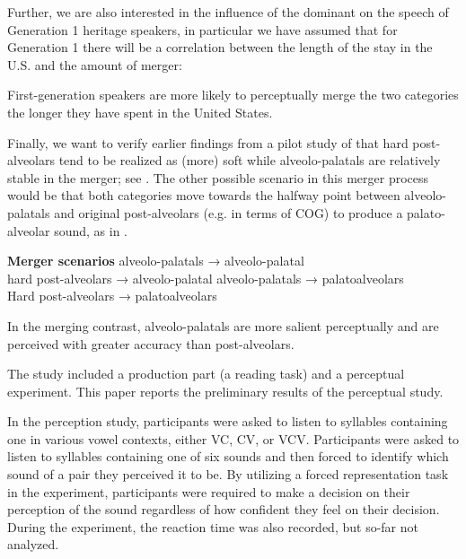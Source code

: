 \documentclass[output=paper,modfonts,newtxmath,hidelinks,]{langscibook}
\begin{document}
Further, we are also interested in the influence of the dominant  on the speech of Generation 1 heritage speakers, in particular we have assumed that for Generation 1 there will be a correlation between the length of the stay in the U.S. and the amount of merger:


\begin{exe}
  First-generation speakers are more likely to perceptually merge   the two categories the longer they have spent in the United   States.
\end{exe}


Finally, we want to verify earlier findings from a pilot study of \citet{Cavar-etal2016} that hard post-alveolars tend to be realized as (more) soft while alveolo-palatals are relatively stable in the merger; see . The other possible scenario in this merger process would be that both categories move towards the halfway point between alveolo-palatals and original post-alveolars (e.g. in terms of COG) to produce a palato-alveolar sound, as in .

\ea\textbf{Merger scenarios}
   \ea\label{ex:mihajlovic:1a}
alveolo-palatals      → alveolo-palatal\\
        hard post-alveolars → alveolo-palatal
\ex\label{ex:mihajlovic:1b}  alveolo-palatals       → palatoalveolars\\
        Hard post-alveolars → palatoalveolars
\z
\z

\begin{exe}
  In the merging contrast, alveolo-palatals are more salient perceptually and are perceived with greater accuracy than post-alveolars.
\end{exe}

The study included a production part (a reading task) and a perceptual experiment. This paper reports the preliminary results of the perceptual study.

In the perception study, participants were asked to listen to syllables containing one  in various vowel contexts, either VC, CV, or VCV. Participants were asked to listen to syllables containing one of six  sounds and then forced to identify which sound of a pair they perceived it to be. By utilizing a forced representation task in the experiment, participants were required to make a decision on their perception of the sound regardless of how confident they feel on their decision. During the experiment, the reaction time was also recorded, but so-far not analyzed.
\end{document}
